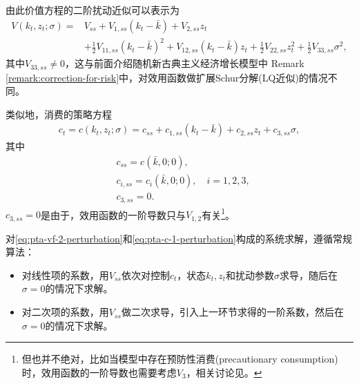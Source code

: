 由此价值方程的二阶扰动近似可以表示为
\begin{equation}
  \label{eq:pta-vf-2-perturbation}
  \begin{split}
    V(k_t,z_t;\sigma) =& V_{ss} + V_{1,ss}(k_t - \bar{k}) + V_{2,ss}z_t \\
    &+\frac{1}{2}V_{11,ss}(k_t - \bar{k})^2 + V_{12,ss}(k_t - \bar{k})z_t +\frac{1}{2}V_{22,ss}z_t^2 + \frac{1}{2} V_{33,ss}\sigma^2,
  \end{split}
\end{equation}
其中$V_{33,ss} \neq 0$，这与前面介绍随机新古典主义经济增长模型中 Remark \ref{remark:correction-for-risk}中，对效用函数做扩展Schur分解(LQ近似)的情况不同。

类似地，消费的策略方程
\begin{equation}
  \label{eq:pta-c-1-perturbation}
  \begin{split}
    c_t = c(k_t,z_t;\sigma) = c_{ss}+ c_{1,ss}(k_t - \bar{k}) + c_{2,ss} z_t + c_{3,ss} \sigma,
  \end{split}
\end{equation}
其中
\begin{equation*}
  \begin{split}
    &c_{ss}=c(\bar{k},0;0), \\
    &c_{i,ss}=c_{i}(\bar{k},0;0), \quad i=1,2,3,\\
    &c_{3,ss}=0.
  \end{split}
\end{equation*}
$c_{3,ss}=0$是由于，效用函数的一阶导数只与$V_{1,2}$有关\footnote{但也并不绝对，比如当模型中存在预防性消费(precautionary consumption)时，效用函数的一阶导数也需要考虑$V_{3}$，相关讨论见\cite{Kimball:1990jc}。}。

对\eqref{eq:pta-vf-2-perturbation}和\eqref{eq:pta-c-1-perturbation}构成的系统求解，遵循常规算法：
\begin{itemize}
  \item 对线性项的系数，用$V_{ss}$依次对控制$c_t$，状态$k_t,z_t$和扰动参数$\sigma$求导，随后在$\sigma=0$的情况下求解。
  \item 对二次项的系数，用$V_{ss}$做二次求导，引入上一环节求得的一阶系数，然后在$\sigma=0$的情况下求解。
\end{itemize}

